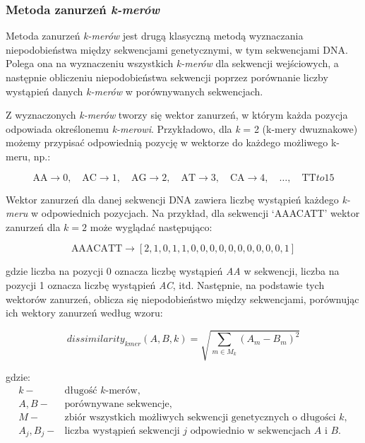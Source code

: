         \subsubsection{Metoda zanurzeń \textit{k-merów}}
            Metoda zanurzeń \textit{k-merów} jest drugą klasyczną metodą wyznaczania niepodobieństwa między sekwencjami genetycznymi, w tym sekwencjami DNA. Polega ona na wyznaczeniu wszystkich \textit{k-merów} dla sekwencji wejściowych, a następnie obliczeniu niepodobieństwa sekwencji poprzez porównanie liczby wystąpień danych \textit{k-merów} w porównywanych sekwencjach.

            Z wyznaczonych \textit{k-merów} tworzy się wektor zanurzeń, w którym każda pozycja odpowiada określonemu \textit{k-merowi}. Przykładowo, dla \textit{k} = 2 (k-mery dwuznakowe) możemy przypisać odpowiednią pozycję w wektorze do każdego możliwego k-meru, np.:

            \[
                \text{AA} \to 0, \quad \text{AC} \to 1, \quad \text{AG} \to 2, \quad \text{AT} \to 3, \quad \text{CA} \to 4, \quad \dots, \quad \text{TT} to 15
              \]


            Wektor zanurzeń dla danej sekwencji DNA zawiera liczbę wystąpień każdego \textit{k-meru} w odpowiednich pozycjach. Na przykład, dla sekwencji `AAACATT' wektor zanurzeń dla $k=2$ może wyglądać następująco:

            \[
                \text{AAACATT} \to [2, 1, 0, 1, 1, 0, 0, 0, 0, 0, 0, 0, 0, 0, 0, 1]
            \]

            gdzie liczba na pozycji 0 oznacza liczbę wystąpień \textit{AA} w sekwencji, liczba na pozycji 1 oznacza liczbę wystąpień \textit{AC}, itd. Następnie, na podstawie tych wektorów zanurzeń, oblicza się niepodobieństwo między sekwencjami, porównując ich wektory zanurzeń według wzoru:

            \begin{equation}
                dissimilarity_{kmer}(A, B, k) = \sqrt{\sum_{m \in M_{k}} (A_m - B_m)^{2}}
            \end{equation}

            gdzie:
            \begin{align*}
                k -& \text{długość $k$-merów}, \\
                A, B -& \text{porównywane sekwencje}, \\
                M -& \text{zbiór wszystkich możliwych sekwencji genetycznych o długości $k$}, \\
                A_j, B_j -& \text{liczba wystąpień sekwencji } j \text{ odpowiednio w sekwencjach } A \text{ i } B. \\
            \end{align*}

